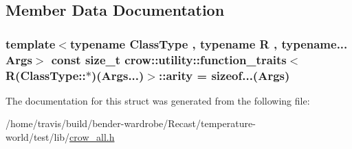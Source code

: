 \subsection{Member Data Documentation}
\hypertarget{structcrow_1_1utility_1_1function__traits_3_01_r_07_class_type_1_1_5_08_07_args_8_8_8_08_4_a70e049ee588a28d26a3745233cae15f7}{
\subsubsection[{arity}]{\setlength{\rightskip}{0pt plus 5cm}template$<$typename Class\-Type , typename R , typename... Args$>$ const size\-\_\-t {\bf crow\-::utility\-::function\-\_\-traits}$<$ R(Class\-Type\-::$\ast$)(Args...)$>$\-::arity = sizeof...(Args)\hspace{0.3cm}{\ttfamily [static]}}}\label{structcrow_1_1utility_1_1function__traits_3_01_r_07_class_type_1_1_5_08_07_args_8_8_8_08_4_a70e049ee588a28d26a3745233cae15f7}


The documentation for this struct was generated from the following file\-:\begin{DoxyCompactItemize}
\item 
/home/travis/build/bender-\/wardrobe/\-Recast/temperature-\/world/test/lib/\hyperlink{crow__all_8h}{crow\-\_\-all.\-h}\end{DoxyCompactItemize}
